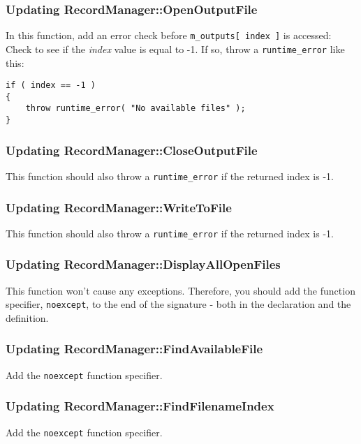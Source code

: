 \documentclass[a4paper,12pt]{book}
\begin{document}
            \subsubsection*{Updating RecordManager::OpenOutputFile}
            In this function, add an error check before
            \texttt{m\_outputs[ index ]} is accessed: Check to see
            if the \textit{index} value is equal to -1. If so, throw
            a \texttt{runtime\_error} like this:

\begin{lstlisting}[style=code]
if ( index == -1 )
{
    throw runtime_error( "No available files" );
}    
\end{lstlisting}

            \subsubsection*{Updating RecordManager::CloseOutputFile}
            This function should also throw a \texttt{runtime\_error} if
            the returned index is -1.

            \subsubsection*{Updating RecordManager::WriteToFile}
            This function should also throw a \texttt{runtime\_error} if
            the returned index is -1.

            \subsubsection*{Updating RecordManager::DisplayAllOpenFiles}
            This function won't cause any exceptions. Therefore,
            you should add the function specifier, \texttt{noexcept},
            to the end of the signature - both in the declaration and
            the definition.

            \subsubsection*{Updating RecordManager::FindAvailableFile}
            Add the \texttt{noexcept} function specifier.

            \subsubsection*{Updating RecordManager::FindFilenameIndex}
            Add the \texttt{noexcept} function specifier.
\end{document}
